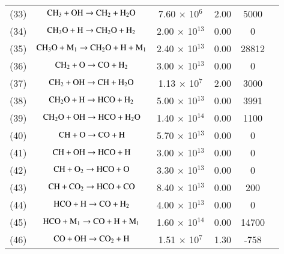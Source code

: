 \documentclass{warpdoc}
\begin{document}
\begin{table}[h]
\begin{center}
\begin{threeparttable}
\begin{tabular}{cccccc}
(33) & $\rm C H_3 + OH \rightarrow C H_2  + H_2 O $ &7.60 $\times$ 10$^{6}$  & 2.00 &5000 &\cite{comb:2010:glassman}\\

(34) & $\rm C H_3 O + H \rightarrow C H_2 O  + H_2 $ &2.00 $\times$ 10$^{13}$  & 0.00 &0 &\cite{rkm:1991:smoke}\\ 

(35) & $\rm C H_3 O + M_1 \rightarrow C H_2 O  + H + M_1 $ &2.40 $\times$ 10$^{13}$  & 0.00 &28812&\cite{rkm:1991:smoke}\tnote{a}\\ 

(36) & $\rm C H_2 + O \rightarrow CO + H_2 $ &3.00 $\times$ 10$^{13}$  & 0.00 & 0 &\cite{comb:2010:glassman}\\ 

(37) & $\rm C H_2 + OH \rightarrow CH + H_2 O$ &1.13 $\times$ 10$^{7}$  & 2.00 & 3000 &\cite{comb:2010:glassman}\\ 

(38) & $\rm C H_2 O + H \rightarrow HCO + H_2 $ &5.00 $\times$ 10$^{13}$  & 0.00 & 3991 &\cite{rkm:1991:smoke}\\ 

(39) & $\rm C H_2 O + OH \rightarrow HCO + H_2 O $ &1.40 $\times$ 10$^{14}$  & 0.00 & 1100 &\cite{rkm:1991:smoke}\\

(40) & $\rm CH  + O \rightarrow CO+H $ &5.70 $\times$ 10$^{13}$  & 0.00 &0&\cite{comb:2010:glassman}\\

(41) & $\rm CH  + OH \rightarrow HCO+H $ &3.00 $\times$ 10$^{13}$  & 0.00 &0&\cite{comb:2010:glassman}\\

(42) & $\rm CH  + O_2 \rightarrow HCO+O $ &3.30 $\times$ 10$^{13}$  & 0.00 &0&\cite{comb:2010:glassman}\\

(43) & $\rm CH  +  C O_2 \rightarrow HCO+CO $ &8.40 $\times$ 10$^{13}$  & 0.00 &200&\cite{comb:2010:glassman}\\

(44) & $\rm HCO  +  H \rightarrow CO + H_2 $ &4.00 $\times$ 10$^{13}$  & 0.00 &0&\cite{rkm:1991:smoke}\\

(45) & $\rm HCO  +  M_1 \rightarrow CO + H + M_1 $ &1.60 $\times$ 10$^{14}$  & 0.00 &14700&\cite{rkm:1991:smoke}\tnote{a}\\
(46) & $\rm CO + OH \rightarrow C O_2 + H $ &1.51 $\times$ 10$^{7}$  & 1.30 &-758&\cite{rkm:1991:smoke}\\


\end{tabular}
\end{threeparttable}
\end{center}
\end{table}
\end{document}
